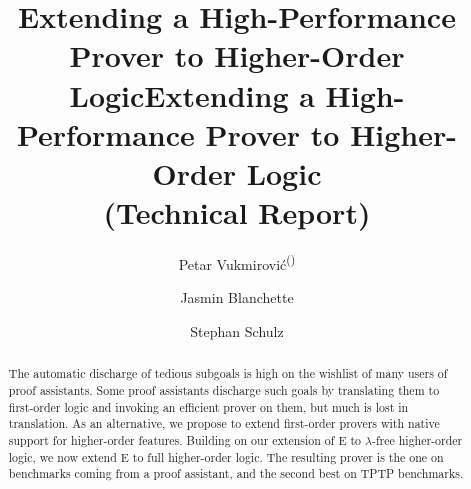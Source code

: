 \newcommand{\comb}[1]{\ensuremath{\mathsf{#1}}}
\newcommand{\neglit}[1]{\ensuremath{#1 \not\eq \itrue}}
\newcommand{\poslit}[1]{\ensuremath{#1 \eq \itrue}}
\newcommand{\lland}{\mathrel\land}
\newcommand{\llor}{\mathrel\lor}
\newcommand{\ccup}{\mathrel\cup}
\newcommand{\ccap}{\mathrel\cap}

\newcommand{\db}[1]{\ensuremath{\mathbf{#1}}}
\newcommand{\dbvar}[1]{\ensuremath{\textbf{\textit{#1}}}}
\newcommand{\internallam}{\ensuremath{\texttt{LAM}}}
\newcommand{\internalat}{\ensuremath{\texttt{@}}}

\newcommand{\lambdabf}{\pmb{\lambda}} %
\newcommand{\betabf}{\pmb{\beta}} %
\newcommand{\etabf}{\pmb{\eta}} %



\newcommand\CORR{\textsuperscript{(\vthinspace\Letter\vthinspace)}}

\confrep
{\title{Extending a High-Performance Prover to Higher-Order Logic}}
{\title{Extending a High-Performance Prover to Higher-Order Logic \\ (Technical Report)}}

\author{Petar Vukmirovi\'c\CORR
  \and
  Jasmin Blanchette
  \and
  Stephan Schulz
  }


\maketitle

\begin{abstract}%
  The automatic discharge of tedious subgoals is high on the wishlist of many
  users of proof assistants. Some proof assistants discharge such goals
  by translating them to first-order logic and invoking an efficient prover on
  them, but much is lost in translation. As an alternative,
  we propose to extend first-order provers with native support for
  higher-order features. Building on our extension of E to $\lambda$-free
  higher-order logic, we now extend E to full higher-order logic.
  The resulting prover is the  one on benchmarks coming from a
  proof assistant, and the second best on TPTP benchmarks.
\end{abstract}

